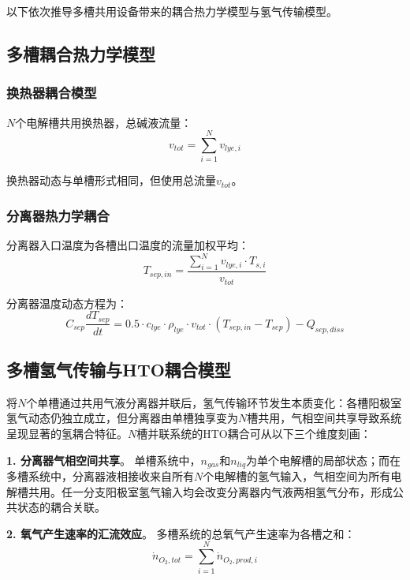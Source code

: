 以下依次推导多槽共用设备带来的耦合热力学模型与氢气传输模型。

\subsection{多槽耦合热力学模型}

\subsubsection{换热器耦合模型}

$N$个电解槽共用换热器，总碱液流量：
\begin{equation}
  v_{tot} = \sum_{i=1}^{N} v_{lye,i}
\end{equation}

换热器动态与单槽形式相同，但使用总流量$v_{tot}$。

\subsubsection{分离器热力学耦合}

分离器入口温度为各槽出口温度的流量加权平均：
\begin{equation}
  T_{sep,in} = \frac{\sum_{i=1}^{N} v_{lye,i} \cdot T_{s,i}}{v_{tot}}
\end{equation}

分离器温度动态方程为：
\begin{equation}
  C_{sep} \frac{dT_{sep}}{dt} = 0.5 \cdot c_{lye} \cdot \rho_{lye} \cdot v_{tot} \cdot (T_{sep,in} - T_{sep}) - Q_{sep,diss}
\end{equation}

\subsection{多槽氢气传输与HTO耦合模型}

将$N$个单槽通过共用气液分离器并联后，氢气传输环节发生本质变化：各槽阳极室氢气动态仍独立成立，但分离器由单槽独享变为$N$槽共用，气相空间共享导致系统呈现显著的氢耦合特征。$N$槽并联系统的HTO耦合可从以下三个维度刻画：

\textbf{1. 分离器气相空间共享}。
单槽系统中，$n_{gas}$和$n_{liq}$为单个电解槽的局部状态；而在多槽系统中，分离器液相接收来自所有$N$个电解槽的氢气输入，气相空间为所有电解槽共用。任一分支阳极室氢气输入均会改变分离器内气液两相氢气分布，形成公共状态的耦合关联。

\textbf{2. 氧气产生速率的汇流效应}。
多槽系统的总氧气产生速率为各槽之和：
\begin{equation}
  \dot{n}_{O_2,tot} = \sum_{i=1}^{N} \dot{n}_{O_2,prod,i}
\end{equation}

